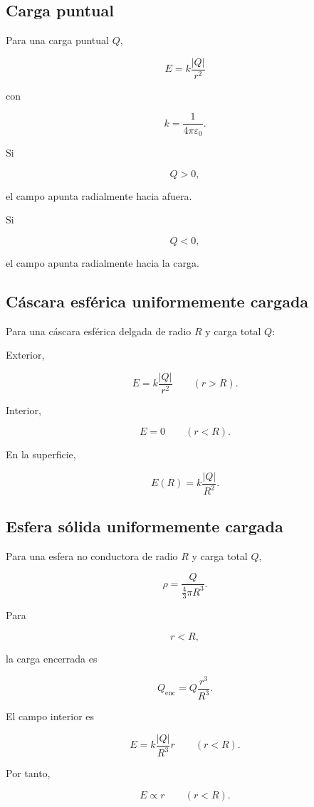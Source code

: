 \subsection{Carga puntual}

Para una carga puntual \(Q\),

\[
\boxed{
E=k\frac{|Q|}{r^2}
}
\]

con

\[
\boxed{
k=\frac{1}{4\pi\varepsilon_0}
}.
\]

Si

\[
Q>0,
\]

el campo apunta radialmente hacia afuera.

Si

\[
Q<0,
\]

el campo apunta radialmente hacia la carga.


\subsection{Cáscara esférica uniformemente cargada}

Para una cáscara esférica delgada de radio \(R\) y carga total \(Q\):

Exterior,

\[
\boxed{
E=k\frac{|Q|}{r^2}
\qquad (r>R)
}.
\]

Interior,

\[
\boxed{
E=0
\qquad (r<R)
}.
\]

En la superficie,

\[
\boxed{
E(R)=k\frac{|Q|}{R^2}
}.
\]


\subsection{Esfera sólida uniformemente cargada}

Para una esfera no conductora de radio \(R\) y carga total \(Q\),

\[
\boxed{
\rho=\frac{Q}{\frac43\pi R^3}
}.
\]

Para

\[
r<R,
\]

la carga encerrada es

\[
\boxed{
Q_{\text{enc}}
=
Q\frac{r^3}{R^3}
}.
\]

El campo interior es

\[
\boxed{
E=k\frac{|Q|}{R^3}r
\qquad (r<R)
}.
\]

Por tanto,

\[
\boxed{E\propto r\qquad(r<R)}.
\]

